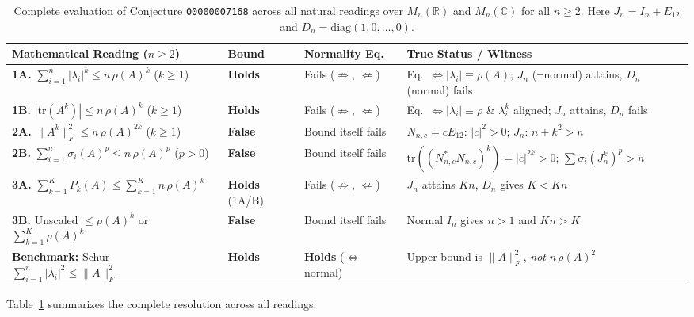 \documentclass[11pt,a4paper]{article}
\theoremstyle{plain}
\theoremstyle{definition}
\newcommand{\C}{\mathbb{C}}
\newcommand{\R}{\mathbb{R}}
\newcommand{\tr}{\mathrm{tr}}
\newcommand{\diag}{\mathrm{diag}}
\begin{document}
\begin{table}[t]
\centering
\small
\renewcommand{\arraystretch}{1.28}
\begin{tabular}{@{}>{\raggedright\arraybackslash}p{}>{\raggedright\arraybackslash}p{}>{\raggedright\arraybackslash}p{}>{\raggedright\arraybackslash}p{}@{}}
\hline
\textbf{Mathematical Reading ($n \ge 2$)} & \textbf{Bound} & \textbf{Normality Eq.} & \textbf{True Status / Witness} \\
\hline
\textbf{1A.} $\sum_{i=1}^n |\lambda_i|^k \le n\,\rho(A)^k$ ($k \ge 1$)
  & \textbf{Holds}
  & Fails ($\not\Rightarrow$, $\not\Leftarrow$)
  & Eq.\ $\Leftrightarrow |\lambda_i|\equiv \rho(A)$; $J_n$ ($\neg$normal) attains, $D_n$ (normal) fails \\
\textbf{1B.} $|\tr(A^k)| \le n\,\rho(A)^k$ ($k \ge 1$)
  & \textbf{Holds}
  & Fails ($\not\Rightarrow$, $\not\Leftarrow$)
  & Eq.\ $\Leftrightarrow |\lambda_i|\equiv\rho$ \& $\lambda_i^k$ aligned; $J_n$ attains, $D_n$ fails \\
\textbf{2A.} $\|A^k\|_F^2 \le n\,\rho(A)^{2k}$ ($k \ge 1$)
  & \textbf{False}
  & Bound itself fails
  & $N_{n,c}=cE_{12}$: $|c|^2 > 0$; $J_n$: $n+k^2 > n$ \\
\textbf{2B.} $\sum_{i=1}^n \sigma_i(A)^p \le n\,\rho(A)^p$ ($p > 0$)
  & \textbf{False}
  & Bound itself fails
  & $\tr((N_{n,c}^*N_{n,c})^k)=|c|^{2k} > 0$; $\sum\sigma_i(J_n^k)^p > n$ \\
\textbf{3A.} $\sum_{k=1}^K P_k(A) \le \sum_{k=1}^K n\,\rho(A)^k$
  & \textbf{Holds} (1A/B)
  & Fails ($\not\Rightarrow$, $\not\Leftarrow$)
  & $J_n$ attains $Kn$, $D_n$ gives $K < Kn$ \\
\textbf{3B.} Unscaled $\le \rho(A)^k$ or $\sum_{k=1}^K \rho(A)^k$
  & \textbf{False}
  & Bound itself fails
  & Normal $I_n$ gives $n > 1$ and $Kn > K$ \\
\hline
\textbf{Benchmark:} Schur $\sum_{i=1}^n |\lambda_i|^2 \le \|A\|_F^2$
  & \textbf{Holds}
  & \textbf{Holds} ($\Leftrightarrow$ normal)
  & Upper bound is $\|A\|_F^2$, \emph{not} $n\,\rho(A)^2$ \\
\hline
\end{tabular}
\caption{Complete evaluation of Conjecture \texttt{00000007168} across all natural readings over $M_n(\R)$ and $M_n(\C)$ for all $n \ge 2$. Here $J_n = I_n + E_{12}$ and $D_n = \diag(1,0,\dots,0)$.}
\label{tab:summary}
\end{table}

Table~\ref{tab:summary} summarizes the complete resolution across all readings.
\end{document}
